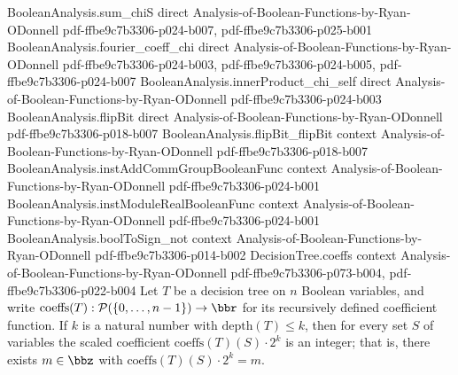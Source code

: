 \begin{lemma}
\proofstep
  {BooleanAnalysis.sum_chiS}
  {direct}
  {Analysis-of-Boolean-Functions-by-Ryan-ODonnell}
  {pdf-ffbe9c7b3306-p024-b007,
    pdf-ffbe9c7b3306-p025-b001}
\proofstep
  {BooleanAnalysis.fourier_coeff_chi}
  {direct}
  {Analysis-of-Boolean-Functions-by-Ryan-ODonnell}
  {pdf-ffbe9c7b3306-p024-b003,
    pdf-ffbe9c7b3306-p024-b005,
    pdf-ffbe9c7b3306-p024-b007}
\proofstep
  {BooleanAnalysis.innerProduct_chi_self}
  {direct}
  {Analysis-of-Boolean-Functions-by-Ryan-ODonnell}
  {pdf-ffbe9c7b3306-p024-b003}
\proofstep
  {BooleanAnalysis.flipBit}
  {direct}
  {Analysis-of-Boolean-Functions-by-Ryan-ODonnell}
  {pdf-ffbe9c7b3306-p018-b007}
\proofstep
  {BooleanAnalysis.flipBit_flipBit}
  {context}
  {Analysis-of-Boolean-Functions-by-Ryan-ODonnell}
  {pdf-ffbe9c7b3306-p018-b007}
\proofstep
  {BooleanAnalysis.instAddCommGroupBooleanFunc}
  {context}
  {Analysis-of-Boolean-Functions-by-Ryan-ODonnell}
  {pdf-ffbe9c7b3306-p024-b001}
\proofstep
  {BooleanAnalysis.instModuleRealBooleanFunc}
  {context}
  {Analysis-of-Boolean-Functions-by-Ryan-ODonnell}
  {pdf-ffbe9c7b3306-p024-b001}
\proofstep
  {BooleanAnalysis.boolToSign_not}
  {context}
  {Analysis-of-Boolean-Functions-by-Ryan-ODonnell}
  {pdf-ffbe9c7b3306-p014-b002}
\proofstep
  {DecisionTree.coeffs}
  {context}
  {Analysis-of-Boolean-Functions-by-Ryan-ODonnell}
  {pdf-ffbe9c7b3306-p073-b004,
    pdf-ffbe9c7b3306-p022-b004}
Let $T$ be a decision tree on $n$ Boolean variables, and write $\mathrm{coeffs}(T) :
\mathcal{P}(\{0,\dots,n-1\}) \to \bbr$ for its recursively defined coefficient function.
If $k$ is a natural number with $\mathrm{depth}(T) \le k$, then for every set $S$ of
variables the scaled coefficient $\mathrm{coeffs}(T)(S)\cdot 2^{k}$ is an integer; that
is, there exists $m \in \bbz$ with $\mathrm{coeffs}(T)(S)\cdot 2^{k} = m$.
\end{lemma}

